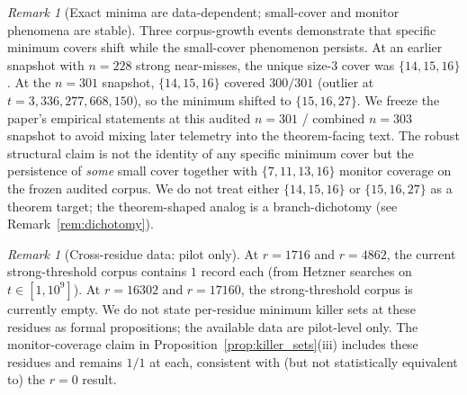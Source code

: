 \documentclass[11pt]{article}
\renewcommand{\_}{\origunderscore\allowbreak}
\theoremstyle{definition}
\theoremstyle{remark}
\newtheorem{remark}[theorem]{Remark}
\begin{document}
\begin{remark}[Exact minima are data-dependent; small-cover and monitor phenomena are stable]\label{rem:unstable_minima}
Three corpus-growth events demonstrate that specific minimum covers
shift while the small-cover phenomenon persists.  At an earlier
snapshot with $n=228$ strong near-misses, the unique size-$3$ cover
was $\{14,15,16\}$. At the $n=301$ snapshot, $\{14,15,16\}$ covered
$300/301$ (outlier at $t=3{,}336{,}277{,}668{,}150$), so the minimum
shifted to $\{15,16,27\}$.  We freeze the paper's empirical
statements at this audited $n=301$ / combined $n=303$ snapshot to
avoid mixing later telemetry into the theorem-facing text.  The
robust structural claim is not the
identity of any specific minimum cover but the persistence of
\emph{some} small cover together with $\{7,11,13,16\}$
monitor coverage on the frozen audited corpus.  We do not treat either $\{14,15,16\}$ or
$\{15,16,27\}$ as a theorem target; the theorem-shaped analog is a
branch-dichotomy (see Remark~\ref{rem:dichotomy}).
\end{remark}

\begin{remark}[Cross-residue data: pilot only]\label{rem:crossres_pilot}
At $r=1716$ and $r=4862$, the current strong-threshold corpus
contains $1$ record each (from Hetzner searches on $t\in[1,10^9]$).
At $r=16302$ and $r=17160$, the strong-threshold corpus is
currently empty. We do not state per-residue minimum killer sets
at these residues as formal propositions; the available data are
pilot-level only. The monitor-coverage claim in
Proposition~\ref{prop:killer_sets}(iii) includes these residues
and remains $1/1$ at each, consistent with (but not statistically
equivalent to) the $r=0$ result.
\end{remark}
\end{document}
